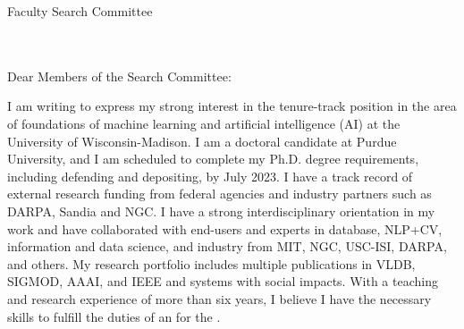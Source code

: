 \documentclass[11pt]{article}
\begin{document}
\thispagestyle{plain}

\pagestyle{empty}

Faculty Search Committee \\
\DepartmentName \\
\InstitutionName \\
\DepartmentAddress

Dear Members of the Search Committee:

I am writing to express my strong interest in the tenure-track position in the area of foundations of machine learning and artificial intelligence (AI) at the University of Wisconsin-Madison.
I am a doctoral candidate at Purdue University, and I am scheduled to complete my Ph.D. degree requirements, including defending and depositing, by July 2023. I have a track record of external research funding from federal agencies and industry partners such as DARPA, Sandia and NGC. I have a strong interdisciplinary orientation in my work and have collaborated with end-users and experts in database, NLP+CV, information and data science, and industry from MIT, NGC, USC-ISI, DARPA, and others. My research portfolio includes multiple publications in VLDB, SIGMOD, AAAI, and IEEE and systems with social impacts.
%
With a teaching and research experience of more than six years, I believe I have the necessary skills to fulfill the duties of an \PositionName{} for the \InstitutionName{}.
\end{document}
